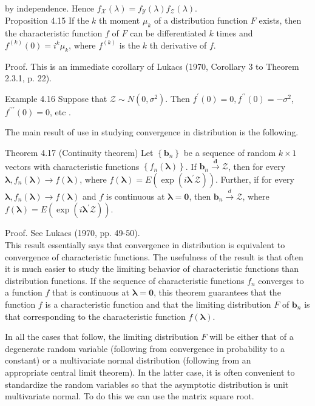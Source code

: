 \documentclass[10pt]{article}
\begin{document}
by independence. Hence $f_{\mathcal{X}}(\lambda)=f_{\mathcal{Y}}(\lambda) f_{\mathcal{Z}}(\lambda)$.\\
Proposition 4.15 If the $k$ th moment $\mu_{k}$ of a distribution function $F$ exists, then the characteristic function $f$ of $F$ can be differentiated $k$ times and $f^{(k)}(0)=i^{k} \mu_{k}$, where $f^{(k)}$ is the $k$ th derivative of $f$.

Proof. This is an immediate corollary of Lukacs (1970, Corollary 3 to Theorem 2.3.1, p. 22).

Example 4.16 Suppose that $\mathcal{Z} \sim N\left(0, \sigma^{2}\right)$. Then $f^{\prime}(0)=0, f^{\prime \prime}(0)=-\sigma^{2}$, $f^{\prime \prime \prime}(0)=0$, etc .

The main result of use in studying convergence in distribution is the following.

Theorem 4.17 (Continuity theorem) Let $\left\{\mathbf{b}_{n}\right\}$ be a sequence of random $k \times 1$ vectors with characteristic functions $\left\{f_{n}(\boldsymbol{\lambda})\right\}$. If $\mathbf{b}_{n} \xrightarrow{\boldsymbol{d}} \boldsymbol{\mathcal { Z }}$, then for every $\boldsymbol{\lambda}, f_{n}(\boldsymbol{\lambda}) \rightarrow f(\boldsymbol{\lambda})$, where $f(\boldsymbol{\lambda})=E\left(\exp \left(i \boldsymbol{\lambda}^{\prime} \boldsymbol{\mathcal { Z }}\right)\right)$. Further, if for every $\boldsymbol{\lambda}, f_{n}(\boldsymbol{\lambda}) \rightarrow f(\boldsymbol{\lambda})$ and $f$ is continuous at $\boldsymbol{\lambda}=\mathbf{0}$, then $\mathbf{b}_{n} \xrightarrow{d} \boldsymbol{\mathcal { Z }}$, where $f(\boldsymbol{\lambda})=E\left(\exp \left(i \boldsymbol{\lambda}^{\prime} \boldsymbol{\mathcal { Z }}\right)\right)$.

Proof. See Lukacs (1970, pp. 49-50).\\
This result essentially says that convergence in distribution is equivalent to convergence of characteristic functions. The usefulness of the result is that often it is much easier to study the limiting behavior of characteristic functions than distribution functions. If the sequence of characteristic functions $f_{n}$ converges to a function $f$ that is continuous at $\boldsymbol{\lambda}=\mathbf{0}$, this theorem guarantees that the function $f$ is a characteristic function and that the limiting distribution $F$ of $\mathbf{b}_{n}$ is that corresponding to the characteristic function $f(\boldsymbol{\lambda})$.

In all the cases that follow, the limiting distribution $F$ will be either that of a degenerate random variable (following from convergence in probability to a constant) or a multivariate normal distribution (following from an\\
appropriate central limit theorem). In the latter case, it is often convenient to standardize the random variables so that the asymptotic distribution is unit multivariate normal. To do this we can use the matrix square root.
\end{document}
